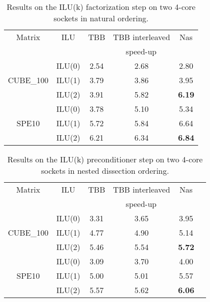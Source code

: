 \begin{table}[!h]
  \renewcommand{\arraystretch}{1.3}
  \caption{Results on the ILU(k) factorization step on two 4-core sockets in natural ordering.}
  \label{tab:full:8:facto:no}
  \centering
  \begin{tabular}{|c|c||c|c|c|}
    \hline
    Matrix & ILU & TBB & TBB interleaved & Nas\\
    &     &  \multicolumn{3}{c|}{speed-up}\\
    \hline
    \hline
    & ILU(0) &            2.54  &  2.68  &  2.80\\
    CUBE\_100 & ILU(1) & 3.79  &  3.86  &  3.95\\
    & ILU(2) &            3.91  &  5.82  &  {\bf 6.19}\\
    \hline
    & ILU(0) &            3.78  &  5.10  &  5.34\\
    SPE10 &     ILU(1) &  5.72  &  5.84  &  6.64\\
    & ILU(2) &            6.21  &  6.34  &  {\bf 6.84}\\
    \hline
  \end{tabular}
\end{table}

\begin{table}[!h]
  \renewcommand{\arraystretch}{1.3}
  \caption{Results on the ILU(k) preconditioner step on two 4-core sockets in nested dissection ordering.}
  \label{tab:full:8:facto:nested}
  \centering
  \begin{tabular}{|c|c||c|c|c|c|}
    \hline
    Matrix & ILU & TBB & TBB interleaved & Nas\\
    &     &  \multicolumn{3}{c|}{speed-up}\\
    \hline
    \hline
    & ILU(0) &            3.31  &  3.65  &  3.95\\
    CUBE\_100 & ILU(1) &  4.77  &  4.90  &  5.14\\
    & ILU(2) &            5.46  &  5.54  &  {\bf 5.72}\\
    \hline
    & ILU(0) &            3.09  &  3.70  &  4.00\\
    SPE10     & ILU(1) &  5.00  &  5.01  &  5.57\\
    & ILU(2) &            5.57  &  5.62  &  {\bf 6.06}\\
    \hline
  \end{tabular}
\end{table}



